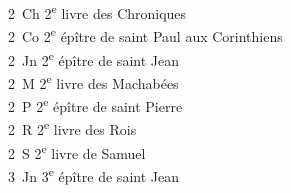 \documentclass [11pt]{article}
\begin{document}
		2~Ch \tabto{5em} 2\textsuperscript{e} livre des Chroniques\\
		2~Co \tabto{5em} 2\textsuperscript{e} épître de saint Paul aux Corinthiens\\
		2~Jn \tabto{5em} 2\textsuperscript{e} épître de saint Jean\\
		2~M \tabto{5em} 2\textsuperscript{e} livre des Machabées\\
		2~P \tabto{5em} 2\textsuperscript{e} épître de saint Pierre\\
		2~R \tabto{5em} 2\textsuperscript{e} livre des Rois\\
		2~S \tabto{5em} 2\textsuperscript{e} livre de Samuel\\
		3~Jn \tabto{5em} 3\textsuperscript{e} épître de saint Jean
	
	
\end{document}
